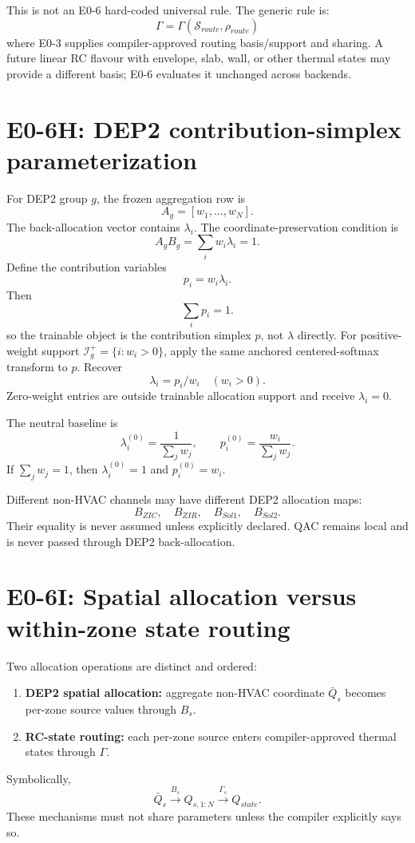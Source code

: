 \documentclass[11pt]{article}
\begin{document}
This is not an E0-6 hard-coded universal rule. The generic rule is:
\[
\boxed{\Gamma=\Gamma(\mathcal S_{route},\rho_{route})}
\]
where E0-3 supplies compiler-approved routing basis/support and sharing.
A future linear RC flavour with envelope, slab, wall, or other thermal states may
provide a different basis; E0-6 evaluates it unchanged across backends.

\section{E0-6H: DEP2 contribution-simplex parameterization}

For DEP2 group $g$, the frozen aggregation row is
\[
A_g=[w_1,\ldots,w_N].
\]
The back-allocation vector contains $\lambda_i$. The coordinate-preservation
condition is
\[
\boxed{A_gB_g=\sum_iw_i\lambda_i=1.}
\]
Define the contribution variables
\[
\boxed{p_i=w_i\lambda_i.}
\]
Then
\[
\boxed{\sum_i p_i=1.}
\]
so the trainable object is the contribution simplex $p$, not $\lambda$ directly.
For positive-weight support $\mathcal I_g^+=\{i:w_i>0\}$, apply the same anchored
centered-softmax transform to $p$. Recover
\[
\boxed{\lambda_i=p_i/w_i\quad(w_i>0).}
\]
Zero-weight entries are outside trainable allocation support and receive
$\lambda_i=0$.

The neutral baseline is
\[
\lambda_i^{(0)}=\frac{1}{\sum_jw_j},
\qquad
p_i^{(0)}=\frac{w_i}{\sum_jw_j}.
\]
If $\sum_jw_j=1$, then $\lambda_i^{(0)}=1$ and $p_i^{(0)}=w_i$.

Different non-HVAC channels may have different DEP2 allocation maps:
\[
B_{ZIC},\quad B_{ZIR},\quad B_{Sol1},\quad B_{Sol2}.
\]
Their equality is never assumed unless explicitly declared. QAC remains local
and is never passed through DEP2 back-allocation.

\section{E0-6I: Spatial allocation versus within-zone state routing}

Two allocation operations are distinct and ordered:
\begin{enumerate}[leftmargin=*]
\item \textbf{DEP2 spatial allocation:} aggregate non-HVAC coordinate $\bar Q_s$
becomes per-zone source values through $B_s$.
\item \textbf{RC-state routing:} each per-zone source enters compiler-approved
thermal states through $\Gamma$.
\end{enumerate}
Symbolically,
\[
\bar Q_s\xrightarrow{B_s}Q_{s,1:N}
\xrightarrow{\Gamma_s}Q_{state}.
\]
These mechanisms must not share parameters unless the compiler explicitly says
so.
\end{document}
